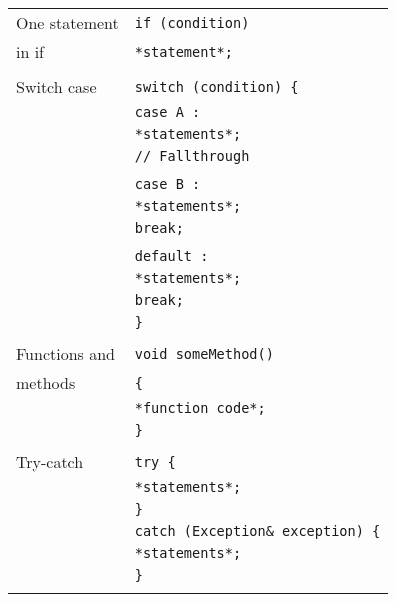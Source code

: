 \documentclass[10pt,landscape]{article}
\begin{document}
\begin{multicols}{3}
\begin{tabular}{@{}ll@{}}
	One statement & \verb!if (condition)! \\
	in if         & \hspace{0.2cm} \verb!*statement*;! \\
	              & \\
	Switch case   & \verb!switch (condition) {! \\
	              & \hspace{0.2cm} \verb!case A :! \\
	              & \hspace{0.4cm} \verb!*statements*;! \\
	              & \hspace{0.4cm} \verb!// Fallthrough! \\
	              & \\
	              & \hspace{0.2cm} \verb!case B :! \\
	              & \hspace{0.4cm} \verb!*statements*;! \\
	              & \hspace{0.4cm} \verb!break;! \\
	              & \\
	              & \hspace{0.2cm} \verb!default : ! \\
	              & \hspace{0.4cm} \verb!*statements*;! \\
	              & \hspace{0.4cm} \verb!break;! \\
	              & \verb!}! \\
	              & \\
	Functions and & \verb!void someMethod()! \\
	methods       & \verb!{! \\
	              & \hspace{0.2cm} \verb!*function code*;! \\
	              & \verb!}! \\
	              & \\
	 Try-catch    & \verb!try {! \\
	              & \hspace{0.2cm} \verb!*statements*;! \\
	              & \verb!}! \\
	              & \verb!catch (Exception& exception) {! \\
	              & \hspace{0.2cm} \verb!*statements*;! \\
	              & \verb!}! \\
	              & \\
\end{tabular}


\end{multicols}
\end{document}
